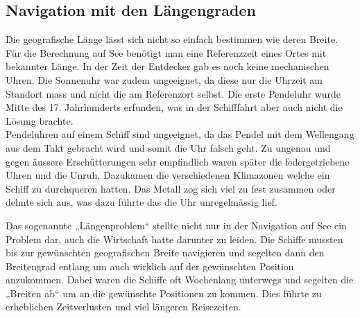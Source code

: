 \begin{refsection}
\subsection{Navigation mit den Längengraden}
Die geografische Länge lässt sich nicht so einfach bestimmen wie deren Breite.
Für die Berechnung auf See benötigt man eine Referenzzeit eines Ortes mit bekannter Länge.
In der Zeit der Entdecker gab es noch keine mechanischen Uhren. Die Sonnenuhr war zudem ungeeignet, da diese nur die Uhrzeit am Standort mass und nicht die am Referenzort selbst. Die erste Pendeluhr wurde Mitte des 17. Jahrhunderts erfunden, was in der Schifffahrt aber auch nicht die Lösung brachte.\\
Pendeluhren auf einem Schiff sind ungeeignet, da das Pendel mit dem Wellengang aus dem Takt gebracht wird und somit die Uhr falsch geht.
Zu ungenau und gegen äussere Erschütterungen sehr empfindlich waren später die federgetriebene Uhren und die Unruh. Dazukamen die verschiedenen Klimazonen welche ein Schiff zu durchqueren hatten. Das Metall zog sich viel zu fest zusammen oder dehnte sich aus, was dazu führte das die Uhr unregelmässig lief.

Das sogenannte „Längenproblem“ stellte nicht nur in der Navigation auf See ein Problem dar, auch die Wirtschaft hatte darunter zu leiden. Die Schiffe mussten bis zur gewünschten geografischen Breite navigieren und segelten dann den Breitengrad entlang um auch wirklich auf der gewünschten Position anzukommen. Dabei waren die Schiffe oft Wochenlang unterwegs und segelten die „Breiten ab“ um an die gewünschte Positionen zu kommen. Dies führte zu erheblichen Zeitverlusten und viel längeren Reisezeiten.




\end{refsection}
